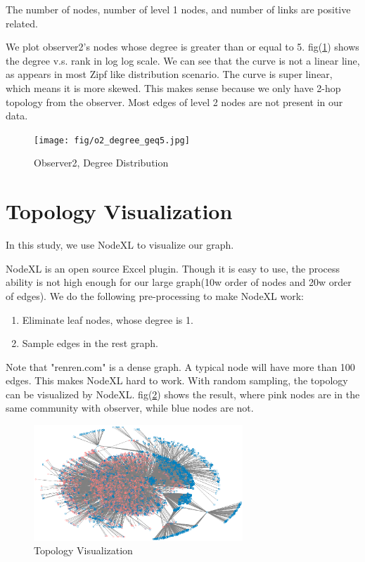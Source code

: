 \documentclass[11pt,a4paper]{article}
\begin{document}
The number of nodes, number of level 1 nodes, and number of links
are positive related.

We plot observer2's nodes whose degree is greater than or equal to 5. 
fig(\ref{fig:o2_degree}) shows the degree v.s. rank in log log scale. 
We can see that the curve is not a linear line, as appears 
in most Zipf like distribution scenario. The curve is 
super linear, which means it is more skewed. This makes
sense because we only have 2-hop topology from the observer. 
Most edges of level 2 nodes are not present in our data. 

\begin{figure}
	\centering
	\texttt{[image: fig/o2\_degree\_geq5.jpg]}
	\caption{Observer2, Degree Distribution}
	\label{fig:o2_degree}
\end{figure}

\section{Topology Visualization}

In this study, we use NodeXL \cite{nodexl} to visualize our graph. 

NodeXL is an open source Excel plugin. Though it is easy to use, 
the process ability is not high enough for our large graph(10w order 
of nodes and 20w order of edges). We do the following 
pre-processing to make NodeXL work:
\begin{enumerate}
	\item Eliminate leaf nodes, whose degree is 1. 
	\item Sample edges in the rest graph. 
\end{enumerate}
Note that "renren.com" is a dense graph. A typical node will have 
more than 100 edges. This makes NodeXL hard to work. With random
sampling, the topology can be visualized by NodeXL. fig(\ref{fig:topo_vis})
shows the result, where pink nodes are in the same community with 
observer, while blue nodes are not. 

\begin{figure}[htb]
	\centering
	\includegraphics[width=0.7\textwidth]{../visualization/sample1W_3.png}
	\caption{Topology Visualization}
	\label{fig:topo_vis}
\end{figure}
\end{document}
